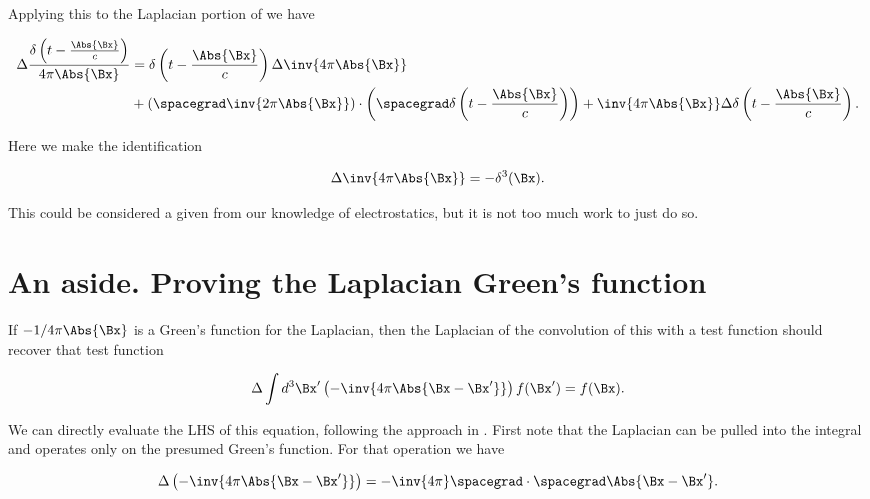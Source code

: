 Applying this to the Laplacian portion of  we have

\begin{equation}\label{eqn:relativisticElectrodynamicsL18:131}
\begin{aligned}
\Delta \frac{\delta\left(t - \frac{\Abs{\Bx}}{c}\right)}{4 \pi \Abs{\Bx} } 
&=
\delta\left(t - \frac{\Abs{\Bx}}{c}\right)
\Delta
\inv{4 \pi \Abs{\Bx} } \\
&+\left(\spacegrad \inv{2 \pi \Abs{\Bx} }\right)
\cdot
\left(
\spacegrad
\delta\left(t - \frac{\Abs{\Bx}}{c}\right) \right)
+
\inv{4 \pi \Abs{\Bx} }
\Delta
\delta\left(t - \frac{\Abs{\Bx}}{c}\right).
\end{aligned}
\end{equation}

Here we make the identification

\begin{equation}\label{eqn:relativisticElectrodynamicsL18:132}
\Delta \inv{4 \pi \Abs{\Bx} } = - \delta^3(\Bx).
\end{equation}

This could be considered a given from our knowledge of electrostatics, but it is not too much work to just do so.

\section{An aside.  Proving the Laplacian Green's function}

If \(-1/{4 \pi \Abs{\Bx} }\) is a Green's function for the Laplacian, then the Laplacian of the convolution of this with a test function should recover that test function

\begin{equation}\label{eqn:relativisticElectrodynamicsL18:133}
\Delta \int d^3 \Bx' \left(-\inv{4 \pi \Abs{\Bx - \Bx'} } \right) f(\Bx') = f(\Bx).
\end{equation}

We can directly evaluate the LHS of this equation, following the approach in \citep{schwartz1987pe}.  First note that the Laplacian can be pulled into the integral and operates only on the presumed Green's function.  For that operation we have

\begin{equation}\label{eqn:relativisticElectrodynamicsL18:134}
\Delta \left(-\inv{4 \pi \Abs{\Bx - \Bx'} } \right)
=
-\inv{4 \pi} \spacegrad \cdot \spacegrad \Abs{\Bx - \Bx'}.
\end{equation}

